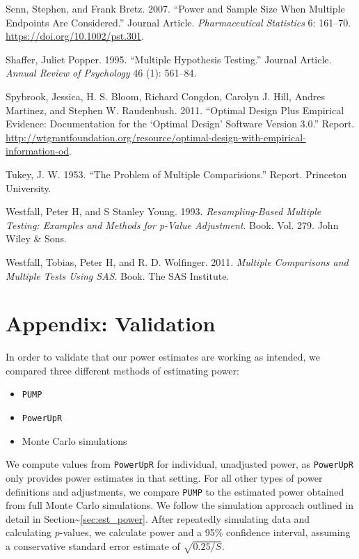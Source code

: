 \documentclass[
]{article}
\providecommand{\tightlist}{%
  \setlength{\itemsep}{0pt}\setlength{\parskip}{0pt}}
\newlength{\cslhangindent}
\newlength{\cslentryspacingunit} %
\newenvironment{CSLReferences}[2] %
 {%
  \setlength{\parindent}{0pt}
  \ifodd #1
  \let\oldpar\par
  \def\par{\hangindent=\cslhangindent\oldpar}
  \fi
  \setlength{\parskip}{#2\cslentryspacingunit}
 }%
 {}
\begin{document}
\begin{CSLReferences}{1}{0}
\leavevmode{}%
Senn, Stephen, and Frank Bretz. 2007. {``Power and Sample Size When
Multiple Endpoints Are Considered.''} Journal Article.
\emph{Pharmaceutical Statistics} 6: 161--70.
\url{https://doi.org/10.1002/pst.301}.

\leavevmode{}%
Shaffer, Juliet Popper. 1995. {``Multiple Hypothesis Testing.''} Journal
Article. \emph{Annual Review of Psychology} 46 (1): 561--84.

\leavevmode{}%
Spybrook, Jessica, H. S. Bloom, Richard Congdon, Carolyn J. Hill, Andres
Martinez, and Stephen W. Raudenbush. 2011. {``Optimal Design Plus
Empirical Evidence: Documentation for the {`Optimal Design'} Software
Version 3.0.''} Report.
\url{http://wtgrantfoundation.org/resource/optimal-design-with-empirical-information-od}.

\leavevmode{}%
Tukey, J. W. 1953. {``The Problem of Multiple Comparisions.''} Report.
Princeton University.

\leavevmode{}%
Westfall, Peter H, and S Stanley Young. 1993. \emph{Resampling-Based
Multiple Testing: Examples and Methods for p-Value Adjustment}. Book.
Vol. 279. John Wiley \& Sons.

\leavevmode{}%
Westfall, Tobias, Peter H, and R. D. Wolfinger. 2011. \emph{Multiple
Comparisons and Multiple Tests Using SAS}. Book. The SAS Institute.

\end{CSLReferences}

\section{Appendix: Validation}

In order to validate that our power estimates are working as intended,
we compared three different methods of estimating power:

\begin{itemize}
\tightlist
\item
  \texttt{PUMP}
\item
  \texttt{PowerUpR}
\item
  Monte Carlo simulations
\end{itemize}

We compute values from \texttt{PowerUpR} for individual, unadjusted
power, as \texttt{PowerUpR} only provides power estimates in that
setting. For all other types of power definitions and adjustments, we
compare \texttt{PUMP} to the estimated power obtained from full Monte
Carlo simulations. We follow the simulation approach outlined in detail
in Section\textasciitilde{}\ref{sec:est_power}. After repeatedly
simulating data and calculating \(p\)-values, we calculate power and a
95\% confidence interval, assuming a conservative standard error
estimate of \(\sqrt{0.25/S}\).
\end{document}
